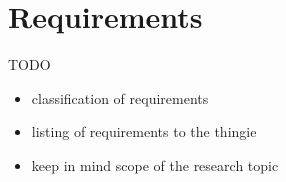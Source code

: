 \chapter{Requirements}
\label{chap:req}

TODO

\begin{itemize}
\item classification of requirements
\item listing of requirements to the thingie
\item keep in mind scope of the research topic
\end{itemize}